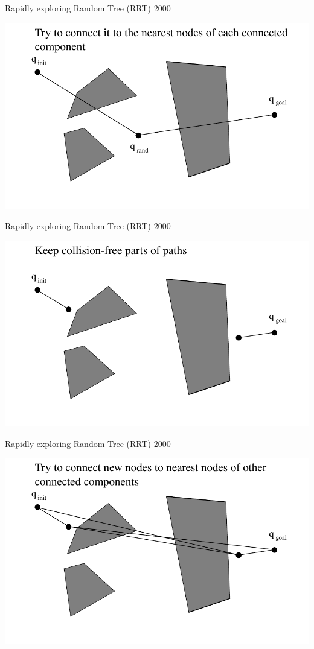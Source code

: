\begin{frame} {Rapidly exploring Random Tree (RRT) 2000}
\centerline {
  \includegraphics[width=.8\linewidth]{figures/RRT02.pdf}
}
\end{frame}

\begin{frame} {Rapidly exploring Random Tree (RRT) 2000}
\centerline {
  \includegraphics[width=.8\linewidth]{figures/RRT04.pdf}
}
\end{frame}

\begin{frame} {Rapidly exploring Random Tree (RRT) 2000}
\centerline {
  \includegraphics[width=.8\linewidth]{figures/RRT05.pdf}
}
\end{frame}


